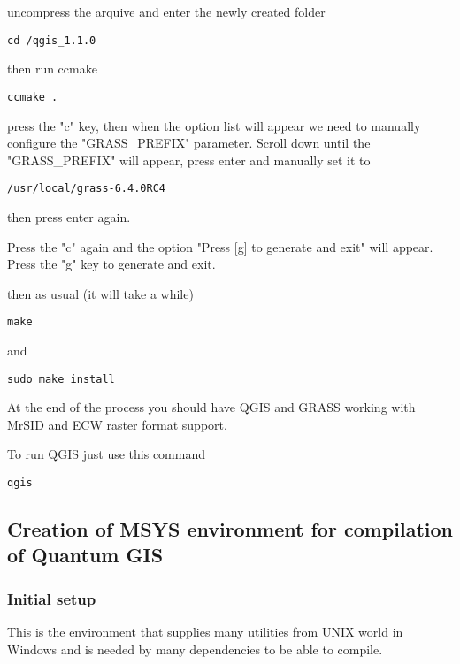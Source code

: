 uncompress the arquive and enter the newly created folder

\begin{verbatim}
cd /qgis_1.1.0
\end{verbatim}

then run ccmake

\begin{verbatim}
ccmake .
\end{verbatim}

press the "c" key, then when the option list will appear we need to manually
configure the "GRASS\_PREFIX" parameter. Scroll down until the "GRASS\_PREFIX" will appear, 
press enter and manually set it to

\begin{verbatim}
/usr/local/grass-6.4.0RC4
\end{verbatim}

then press enter again.

Press the "c" again and the option "Press [g] to generate and exit" will appear.
Press the "g" key to generate and exit.

then as usual (it will take a while)

\begin{verbatim}
make
\end{verbatim}

and

\begin{verbatim}
sudo make install
\end{verbatim}

At the end of the process you should have QGIS and GRASS working with MrSID and ECW
raster format support.

To run QGIS just use this command 

\begin{verbatim}
qgis
\end{verbatim}


\hypertarget{toc61}{}
\subsection{Creation of MSYS environment for compilation of Quantum GIS}
\hypertarget{toc62}{}
\subsubsection{Initial setup}
\hypertarget{toc63}{}
This is the environment that supplies many utilities from UNIX world in Windows and is needed
by many dependencies to be able to compile.

